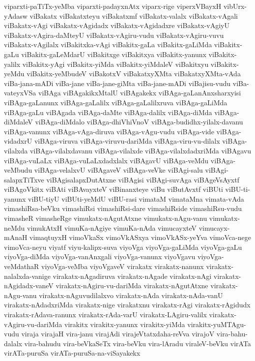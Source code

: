 {viparxti-paTiTx-yeMba
viparxti-padayxnAtx
viparx-rige
viperxVBayxH
vibUrx-yAdasw
viBakatx
viBakatxteyu
viBakatxmf
viBakatx-valalx
viBakatx-vAgali
viBakatx-vAgi
viBakatx-vAgidadx
viBakatx-vAgidadxre
viBakatx-vAgiyU
viBakatx-vAgira-daMteyU
viBakatx-vAgiru-vudu
viBakatx-vAgiru-vuvu
viBakatx-vAgilalx
viBakitxka-vAgi
viBakitx-gaLa
viBakitx-gaLiMda
viBakitx-gaLu
viBakitx-gaLeMdarU
viBakitxge
viBakitxya
viBakitx-yanunx
viBakitx-yalilx
viBakitx-yAgi
viBakitx-yiMda
viBakitx-yiMdaleV
viBakitxyu
viBakitx-yeMdu
viBakitx-yeMbudeV
viBakotxV
viBakatxyXMta
viBakatxyXMta-vAda
viBa-jana-mADi
viBa-jane
viBa-jane-giMta
viBa-jane-mADi
viBajisu-vudu
viBa-vateyxVSa
viBAga
viBAgakikxMtalU
viBAgakekx
viBAga-gaLanAnxsharxyisi
viBAga-gaLanunx
viBAga-gaLalilx
viBAga-gaLalilxruva
viBAga-gaLiMda
viBAga-gaLu
viBAgada
viBAga-daMte
viBAga-dalilx
viBAga-diMda
viBAga-diMdaleV
viBAga-diMdalo
viBAga-dhiVhiVnoV
viBAga-budidhx-yilalx-davanu
viBAga-vanunx
viBAga-vAga-diruva
viBAga-vAgu-vudu
viBAga-vide
viBAga-vidadxrU
viBAga-viruva
viBAga-viruvu-dariMda
viBAga-viru-vu-dilalx
viBAga-vilalxda
viBAga-vilalxdavanu
viBAga-vilalxde
viBAga-vilalxdadxriMda
viBAgavu
viBAga-vuLaLx
viBAga-vuLaLxdadxlalx
viBAgavU
viBAga-veMdu
viBAga-veMbudu
viBAga-velalxvU
viBAgaveV
viBAga-veVke
viBAgi-salu
viBAgi-salapxTiTxve
viBAgisalapxDutAtxne
viBAgisi
viBAgi-suvAga
viBAgeVsAyxtf
viBAgoVkitx
viBAti
viBAvayxteV
viBinanxteye
viBu
viButAvxtf
viBUti
viBU-ti-yanunx
viBU-tiyU
viBUti-yeMdU
viBU-rasi
vimataM
vimataMna
vimata-vAda
vimashiRsa-beVku
vimashiRsi
vimashiRsi-dare
vimashiRside
vimashiRsu-vudu
vimasheR
vimasheRge
vimukatx-nAgutAtxne
vimukatx-nAgu-vanu
vimukatx-neMdu
vimukAtxH
vimuKa-nAgiye
vimuKa-nAda
vimucayxteV
vimucayx-mAnaH
vimaqtuyxH
vimoVkaSx
vimoVkASxya
vimoVkASx-yeYva
vimoVca-nege
vimoVca-neyu
viyatf
viyu-kalipx-suva
viyoVga
viyoVga-gaLiMda
viyoVga-gaLu
viyoVga-diMda
viyoVga-vanAnxgali
viyoVga-vanunx
viyoVgavu
viyoVga-veMdathaR
viyoVga-veMba
viyoVgaveV
virakatx
virakatx-nanunx
virakatx-nalalxda-vanige
virakatx-nAgadiruva
virakatx-nAgade
virakatx-nAgi
virakatx-nAgidadx-vaneV
virakatx-nAgiru-vu-dariMda
virakatx-nAgutAtxne
virakatx-nAgu-vanu
virakatx-nAguvudilalxvo
virakatx-nAda
virakatx-nAda-vanU
virakatx-nAdadxriMda
virakatx-nige
virakatxnu
virakatx-rAgi
virakatx-rAgidudx
virakatx-rAdava-ranunx
virakatx-rAda-varU
virakatx-LAgiru-valilx
virakatx-vAgiru-vu-dariMda
virakitx
virakitx-yanunx
virakitx-yiMda
virakitx-yuMTAgu-vudu
viraja
virajaH
vira-janu
virajAdi
virajeVtatxdaha-reVva
virajoV
vira-bahu-dalalx
vira-bahudu
vira-beVkaSeTx
vira-beVku
vira-lAradu
viraleV-beVku
virATa
virATa-puruSa
virATa-puruSa-na-viSayakekx
}
